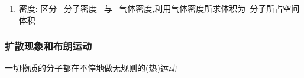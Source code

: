 \documentclass{article}
\begin{document}
\begin{enumerate}
\begin{enumerate}[label = (\arabic*{})]
                  \vspace{-1em}
                  \hspace{-1em}
                  \begin{adjustbox}{minipage=0.38\linewidth, bgcolor=gray!20, padding=1em}
                      \small %
                      标况: $0^{\circ}C$,一个标准大气压(约$101kPa$)
                  \end{adjustbox}

              \item[] 密度: 区分 \, 分子密度 \, 与 \, 气体密度,利用气体密度所求体积为 \,分子所占空间体积
          \end{enumerate}

\end{enumerate}

\vspace{2em}

\subsubsection{扩散现象和布朗运动}
一切物质的分子都在不停地做无规则的(热)运动
\end{document}

